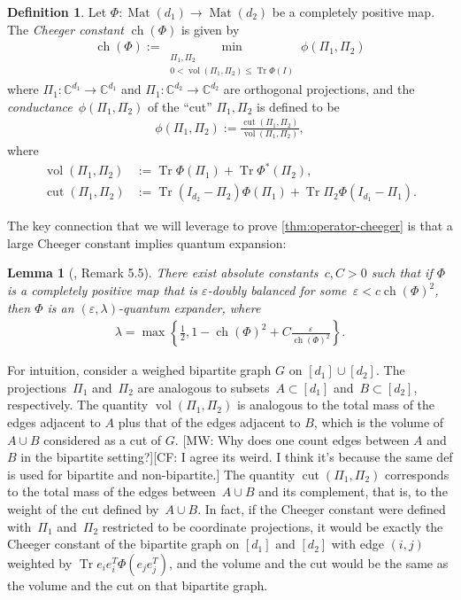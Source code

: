 \documentclass[aos]{imsart}
\newtheorem{lemma}[theorem]{Lemma}
\theoremstyle{definition}
\newtheorem{definition}[theorem]{Definition}
\numberwithin{equation}{section}
\DeclareMathOperator{\vol}{vol}
\DeclareMathOperator{\cut}{cut}
\DeclareMathOperator{\ch}{ch}
\DeclareMathOperator{\Mat}{Mat}
\DeclareMathOperator{\tr}{Tr}
\newcommand{\C}{{\mathbb{C}}}
\newcommand{\eps}{\varepsilon}
\newcommand{\CF}[1]{{\color{purple}[CF: #1]}}
\newcommand{\MW}[1]{{\color{red}[MW: #1]}}
\newcommand{\CF}[1]{{}}
\newcommand{\MW}[1]{{}}
\begin{document}
\begin{appendix}
\begin{definition}\label{def:cheeger}
Let $\Phi \colon \Mat(d_1) \to \Mat(d_2)$ be a completely positive map.
The \emph{Cheeger constant} $\ch(\Phi)$ is given by
\begin{align*}
  \ch(\Phi) := \min_{\substack{\Pi_1, \Pi_2 \\ 0 < \vol(\Pi_1, \Pi_2) \leq \tr \Phi(I)}} \phi(\Pi_1,\Pi_2)
\end{align*}
where $\Pi_1\colon \C^{d_1} \to \C^{d_1}$ and $\Pi_1\colon \C^{d_2} \to \C^{d_2}$ are orthogonal projections, and the \emph{conductance}~$\phi(\Pi_1, \Pi_2)$ of the ``cut'' $\Pi_1, \Pi_2$ is defined to be
\begin{align*}
  \phi(\Pi_1,\Pi_2) := \frac{\cut(\Pi_1, \Pi_2)}{\vol(\Pi_1,\Pi_2)},
\end{align*}
where
\begin{align*}
  \vol(\Pi_1,\Pi_2) &:= \tr \Phi(\Pi_1) + \tr \Phi^*(\Pi_2), \\
  \cut(\Pi_1, \Pi_2) &:= \tr (I_{d_2} - \Pi_2) \Phi(\Pi_1) + \tr \Pi_2 \Phi(I_{d_1} - \Pi_1).
\end{align*}
\end{definition}

The key connection that we will leverage to prove \cref{thm:operator-cheeger} is that a large Cheeger constant implies quantum expansion:

\begin{lemma} [\cite{FM20}, Remark 5.5]\label{lem:op-cheeger}
There exist absolute constants~$c, C>0$ such that if $\Phi$ is a completely positive map that is $\eps$-doubly balanced for some~$\eps < c \ch(\Phi)^2$, then $\Phi$ is an $(\eps,\lambda)$-quantum expander, where
\begin{align*}
  \lambda = \max\left\{ \frac12, 1 -  \ch(\Phi)^2 + C \frac{\eps}{\ch(\Phi)^2} \right\}.
\end{align*}
\end{lemma}

For intuition, consider a weighed bipartite graph $G$ on $[d_1] \cup [d_2]$.
The projections~$\Pi_1$ and~$\Pi_2$ are analogous to subsets~$A \subset[d_1]$ and~$B \subset [d_2]$, respectively.
The quantity $\vol(\Pi_1, \Pi_2)$ is analogous to the total mass of the edges adjacent to $A$ plus that of the edges adjacent to $B$, which is the volume of $A \cup B$ considered as a cut of $G$.
\MW{Why does one count edges between $A$ and $B$ in the bipartite setting?}\CF{I agree its weird. I think it's because the same def is used for bipartite and non-bipartite.}
The quantity $\cut(\Pi_1, \Pi_2)$ corresponds to the total mass of the edges between~$A \cup B$ and its complement, that is, to the weight of the cut defined by~$A \cup B$.
In fact, if the Cheeger constant were defined with~$\Pi_1$ and~$\Pi_2$ restricted to be coordinate projections, it would be exactly the Cheeger constant of the bipartite graph on $[d_1]$ and $[d_2]$ with edge $(i,j)$ weighted by $\tr e_i e_i^T \Phi(e_j e_j^T)$, and the volume and the cut would be the same as the volume and the cut on that bipartite graph.


\end{appendix}
\end{document}

